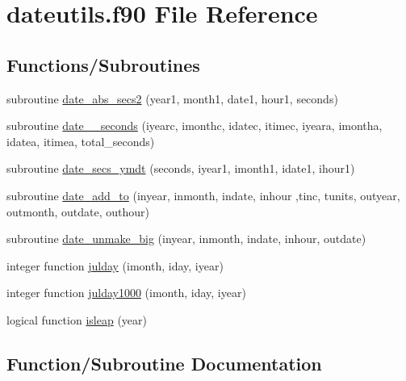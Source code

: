 \hypertarget{dateutils_8f90}{}\section{dateutils.\+f90 File Reference}
\label{dateutils_8f90}
\subsection*{Functions/\+Subroutines}
\begin{DoxyCompactItemize}
\item 
subroutine \hyperlink{dateutils_8f90_a56423cc8c95e08c48faaadf0ae9a2100}{date\+\_\+abs\+\_\+secs2} (year1, month1, date1, hour1, seconds)
\item 
subroutine \hyperlink{dateutils_8f90_a6e1601cbd2ee1d2c2aae57cf1a9cba68}{date\+\_\+\_\+seconds} (iyearc, imonthc, idatec, itimec,           iyeara, imontha, idatea, itimea, total\+\_\+seconds)
\item 
subroutine \hyperlink{dateutils_8f90_abd0aaee09a0949cfef32003dae34f41d}{date\+\_\+secs\+\_\+ymdt} (seconds, iyear1, imonth1, idate1, ihour1)
\item 
subroutine \hyperlink{dateutils_8f90_a058d13b6be70177c02578d5e989fa8e9}{date\+\_\+add\+\_\+to} (inyear, inmonth, indate, inhour                                                                                               ,tinc, tunits, outyear, outmonth, outdate, outhour)
\item 
subroutine \hyperlink{dateutils_8f90_a151300a087ebed5a3efb44a63988654c}{date\+\_\+unmake\+\_\+big} (inyear, inmonth, indate, inhour, outdate)
\item 
integer function \hyperlink{dateutils_8f90_ab4306c1f20ef02cf582fb1050fa0c5d9}{julday} (imonth, iday, iyear)
\item 
integer function \hyperlink{dateutils_8f90_a9e268003476faf6e3551f0b04714231a}{julday1000} (imonth, iday, iyear)
\item 
logical function \hyperlink{dateutils_8f90_acbfdb1c78beb593447108203011b380c}{isleap} (year)
\end{DoxyCompactItemize}


\subsection{Function/\+Subroutine Documentation}
\hypertarget{dateutils_8f90_a6e1601cbd2ee1d2c2aae57cf1a9cba68}{}
